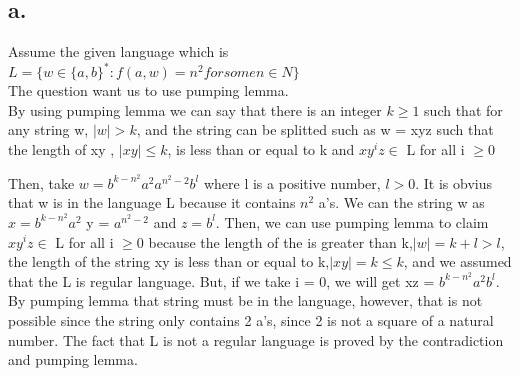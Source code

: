 \documentclass[12pt]{article}
\begin{document}
\subsection*{a.}

Assume the given language which is $L = \{w \in \{a,b\}^{*} : f(a,w) = n^{2} for some n \in N \}$ \\

The question want us to use pumping lemma. \\

By using pumping lemma we can say that there is an integer $k \geq 1$ such that for any string w, $|w| > k$, and the string can be splitted such as  w = xyz such that the length of xy , $|xy| \leq k$, is less than or equal to k and $xy^iz \in$ L for all i $\geq 0$

Then, take $w = b^{k - n^2}a^2a^{n^2-2}b^l$ where l is a positive number, $l > 0$. It is obvius that w is in the language L because it contains $n^2$ a's. We can the string w as $x = b^{k - n^2}a^2$ y = $a^{n^2-2}$ and $z = b^l$. Then, we can use pumping lemma to claim $xy^iz \in$ L for all i $\geq 0$ because the length of the is greater than k,$|w| = k + l > l$, the length of the string xy is less than or equal to k,$|xy| = k \leq k$, and we assumed that the L is regular language.
But, if we take i = 0, we will get xz = $b^{k - n^2}a^2b^l$. By pumping lemma that string must be in the language, however, that is not possible since the string only contains 2 a's, since 2 is not a square of a natural number. The fact that L is not a regular language is proved by the contradiction and pumping lemma. 
\end{document}
